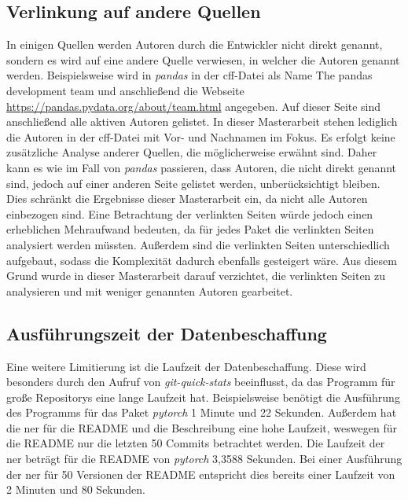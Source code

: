 \subsection*{Verlinkung auf andere Quellen}
\label{subsec:verlinkung_auf_andere_quellen}
In einigen Quellen werden Autoren durch die Entwickler nicht direkt genannt, sondern es wird auf eine andere Quelle verwiesen, in welcher die Autoren genannt werden.
Beispielsweise wird in \emph{pandas} in der \gls{cff}-Datei als Name \glqq The pandas development team\grqq{} und anschließend die Webseite \url{https://pandas.pydata.org/about/team.html} angegeben.
Auf dieser Seite sind anschließend alle aktiven Autoren gelistet.
In dieser Masterarbeit stehen lediglich die Autoren in der \gls{cff}-Datei mit Vor- und Nachnamen im Fokus.
Es erfolgt keine zusätzliche Analyse anderer Quellen, die möglicherweise erwähnt sind.
Daher kann es wie im Fall von \emph{pandas} passieren, dass Autoren, die nicht direkt genannt sind, jedoch auf einer anderen Seite gelistet werden, unberücksichtigt bleiben.
Dies schränkt die Ergebnisse dieser Masterarbeit ein, da nicht alle Autoren einbezogen sind.
Eine Betrachtung der verlinkten Seiten würde jedoch einen erheblichen Mehraufwand bedeuten, da für jedes Paket die verlinkten Seiten analysiert werden müssten.
Außerdem sind die verlinkten Seiten unterschiedlich aufgebaut, sodass die Komplexität dadurch ebenfalls gesteigert wäre.
Aus diesem Grund wurde in dieser Masterarbeit darauf verzichtet, die verlinkten Seiten zu analysieren und mit weniger genannten Autoren gearbeitet.

\subsection*{Ausführungszeit der Datenbeschaffung}
\label{subsec:ausfuehrungszeit_der_datenbeschaffung}
Eine weitere Limitierung ist die Laufzeit der Datenbeschaffung.
Diese wird besonders durch den Aufruf von \emph{git-quick-stats} beeinflusst, da das Programm für große Repositorys eine lange Laufzeit hat.
Beispielsweise benötigt die Ausführung des Programms für das Paket \emph{pytorch} 1 Minute und 22 Sekunden.
Außerdem hat die \gls{ner} für die README und die Beschreibung eine hohe Laufzeit, weswegen für die README nur die letzten 50 Commits betrachtet werden.
Die Laufzeit der \gls{ner} beträgt für die README von \emph{pytorch} 3,3588 Sekunden.
Bei einer Ausführung der \gls{ner} für 50 Versionen der README entspricht dies bereits einer Laufzeit von 2 Minuten und 80 Sekunden.

